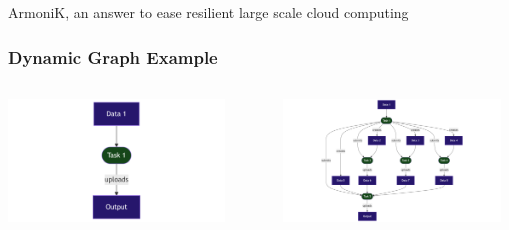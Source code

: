 \documentclass[10pt,aspectratio=1609]{beamer}
\begin{document}
\begin{section}{ArmoniK, an answer to ease resilient large scale cloud computing}
  \begin{frame}
    \frametitle{Dynamic Graph Example}
    \begin{columns}[T]
      \begin{column}{0.3\textwidth}
        \centering
        \vspace{1cm}
        \vfill
        \includegraphics[width=0.95\textwidth]{mermaid-dynamic-part1.png}
      \end{column}
      \begin{column}{0.05\textwidth}
        \centering
        \vspace{1.7cm}
        \vfill
        $\Rightarrow$
      \end{column}
      \begin{column}{0.65\textwidth}
        \centering
        \includegraphics[width=0.95\textwidth]{mermaid-dynamic-part2.png}
      \end{column}
    \end{columns}
  \end{frame}


\end{section}
\end{document}
